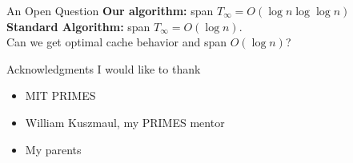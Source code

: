 \documentclass[xcolor=x11names, svgnames, rgb]{beamer}
\newcommand{\polylog}{\operatorname{polylog}}
\begin{document}



\begin{frame}[t]{An Open Question}
	\vspace{0.5cm}
	\textbf{Our algorithm:} span $T_\infty = O(\log n \log\log n)$\\
	\vspace{0.5cm}
	\textbf{Standard Algorithm:} span $T_\infty = O(\log n)$.\\
	\vspace{1cm}
	Can we get optimal cache behavior and span $O(\log n)$?
\end{frame}

\begin{frame}[t]{Acknowledgments}
I would like to thank
\begin{itemize}
	\item {MIT PRIMES}
	\item {William Kuszmaul, my PRIMES mentor}
	\item {My parents}
\end{itemize}
\end{frame}
\end{document}

